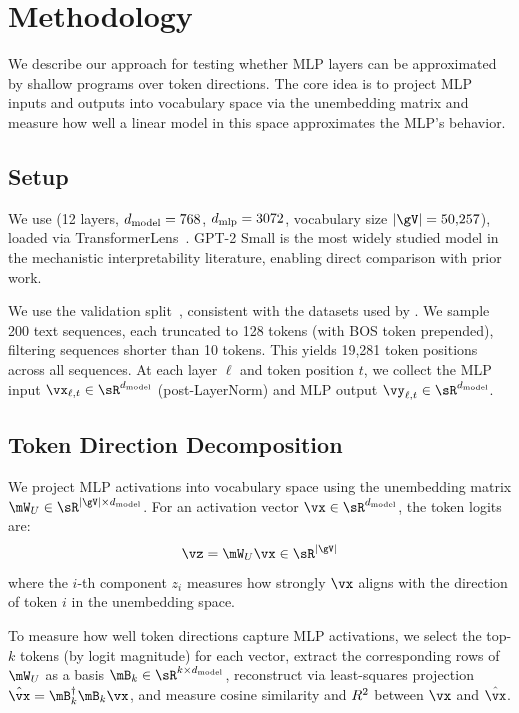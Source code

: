 \section{Methodology}
\label{sec:method}

We describe our approach for testing whether MLP layers can be approximated by shallow programs over token directions.
The core idea is to project MLP inputs and outputs into vocabulary space via the unembedding matrix and measure how well a linear model in this space approximates the MLP's behavior.

\subsection{Setup}
\label{sec:setup}

We use \gpttwo (12 layers, $d_{\text{model}} = 768$, $d_{\text{mlp}} = 3072$, vocabulary size $|\gV| = 50{,}257$), loaded via TransformerLens~\citep{nanda2022transformerlens}.
GPT-2 Small is the most widely studied model in the mechanistic interpretability literature, enabling direct comparison with prior work.

We use the \wikitext validation split~\citep{merity2017pointer}, consistent with the datasets used by \citet{geva2021transformer,geva2022transformer}.
We sample 200 text sequences, each truncated to 128 tokens (with BOS token prepended), filtering sequences shorter than 10 tokens.
This yields 19,281 token positions across all sequences.
At each layer $\ell$ and token position $t$, we collect the MLP input $\vx_{\ell,t} \in \sR^{\dmodel}$ (post-LayerNorm) and MLP output $\vy_{\ell,t} \in \sR^{\dmodel}$.

\subsection{Token Direction Decomposition}
\label{sec:decomposition}

We project MLP activations into vocabulary space using the unembedding matrix $\Wu \in \sR^{|\gV| \times \dmodel}$.
For an activation vector $\vx \in \sR^{\dmodel}$, the token logits are:
\begin{equation}
    \vz = \Wu \vx \in \sR^{|\gV|}
    \label{eq:projection}
\end{equation}
where the $i$-th component $z_i$ measures how strongly $\vx$ aligns with the direction of token $i$ in the unembedding space.

To measure how well token directions capture MLP activations, we select the top-$k$ tokens (by logit magnitude) for each vector, extract the corresponding rows of $\Wu$ as a basis $\mB_k \in \sR^{k \times \dmodel}$, reconstruct via least-squares projection $\hat{\vx} = \mB_k^{\dagger} \mB_k \vx$, and measure cosine similarity and $R^2$ between $\vx$ and $\hat{\vx}$.


